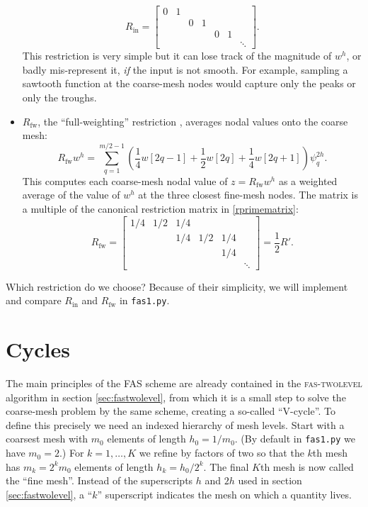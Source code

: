 \documentclass[letterpaper,final,12pt,reqno]{amsart}
\newcommand{\Rin}{R_{\text{in}}}
\newcommand{\Rfw}{R_{\text{fw}}}
\begin{document}
\begin{itemize}
\begin{equation}
\Rin = \begin{bmatrix}
0 & 1 &   &   &   &   &\\
  &   & 0 & 1 &   &   & \\
  &   &   &   & 0 & 1 & \\
  &   &   &   &   &   & \ddots
\end{bmatrix}. \label{rinmatrix}
\end{equation}
This restriction is very simple but it can lose track of the magnitude of $w^h$, or badly mis-represent it, \emph{if} the input is not smooth.  For example, sampling a sawtooth function at the coarse-mesh nodes would capture only the peaks or only the troughs.
\item $\Rfw$, the ``full-weighting'' restriction \cite{Briggsetal2000}, averages nodal values onto the coarse mesh:
\begin{equation}
  \Rfw w^h = \sum_{q=1}^{m/2-1} \left(\frac{1}{4} w[2q-1] + \frac{1}{2} w[2q] + \frac{1}{4} w[2q+1]\right) \psi_q^{2h}. \label{rfwdefinition}
\end{equation}
This computes each coarse-mesh nodal value of $z=\Rfw w^h$ as a weighted average of the value of $w^h$ at the three closest fine-mesh nodes.  The matrix is a multiple of the canonical restriction matrix in \eqref{rprimematrix}:
\begin{equation}
\Rfw = \begin{bmatrix}
1/4 & 1/2 & 1/4 &     &     &  \\
    &     & 1/4 & 1/2 & 1/4 &  \\
    &     &     &     & 1/4 &  \\
    &     &     &     &     & \ddots
\end{bmatrix} = \frac{1}{2} R'. \label{rfwmatrix}
\end{equation}
\end{itemize}

\medskip
Which restriction do we choose?  Because of their simplicity, we will implement and compare $\Rin$ and $\Rfw$ in \texttt{fas1.py}.


\section{Cycles} \label{sec:cycles}

The main principles of the FAS scheme are already contained in the \textsc{fas-twolevel} algorithm in section \ref{sec:fastwolevel}, from which it is a small step to solve the coarse-mesh problem by the same scheme, creating a so-called ``V-cycle''.  To define this precisely we need an indexed hierarchy of mesh levels.  Start with a coarsest mesh with $m_0$ elements of length $h_0=1/m_0$.  (By default in \texttt{fas1.py} we have $m_0=2$.)  For $k=1,\dots,K$ we refine by factors of two so that the $k$th mesh has $m_k=2^k m_0$ elements of length $h_k=h_0/2^k$.  The final $K$th mesh is now called the ``fine mesh''.  Instead of the superscripts $h$ and $2h$ used in section \ref{sec:fastwolevel}, a ``$k$'' superscript indicates the mesh on which a quantity lives.
\end{document}
